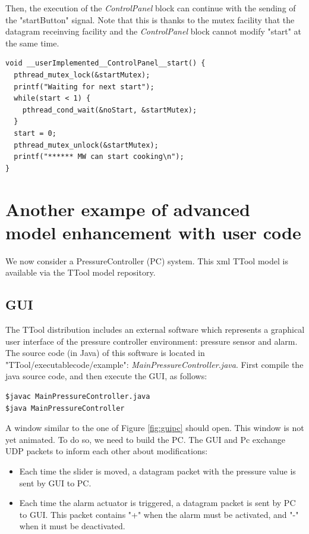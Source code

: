 \documentclass[12pt]{article}
\begin{document}
Then, the execution of the \textit{ControlPanel} block can continue with the sending of the "startButton" signal. Note that  this is thanks to the mutex facility that the datagram receinving facility and the \textit{ControlPanel} block cannot modify "start" at the same time.\\

\begin{lstlisting}
void __userImplemented__ControlPanel__start() {
  pthread_mutex_lock(&startMutex);
  printf("Waiting for next start");
  while(start < 1) {
    pthread_cond_wait(&noStart, &startMutex);
  }
  start = 0;
  pthread_mutex_unlock(&startMutex);
  printf("****** MW can start cooking\n");
}
\end{lstlisting}

\newpage
\section{Another exampe of advanced model enhancement with user code}\label{sec:otheradvanced}
We now consider a PressureController (PC) system. This xml TTool model is available via the TTool model repository.
\subsection{GUI}
The TTool distribution includes an external software which represents a graphical user interface of the pressure controller environment: pressure sensor and alarm. The source code (in Java) of this software is located in "TTool/executablecode/example": \textit{MainPressureController.java}.
 First compile the java source code, and then execute the GUI, as follows:
\begin{lstlisting}
$javac MainPressureController.java
$java MainPressureController
\end{lstlisting}
A window similar to the one of Figure \ref{fig:guipc} should open. This window is not yet animated. To do so, we need to build the PC. The GUI and Pc exchange UDP packets to inform each other about modifications:
\begin{itemize}
\item Each time the slider is moved, a datagram packet with the pressure value is sent by GUI to PC.
\item Each time the alarm actuator is triggered, a datagram packet is sent by PC to GUI. This packet contains "+" when the alarm must be activated, and "-" when it must be deactivated.
\end{itemize}
\end{document}
